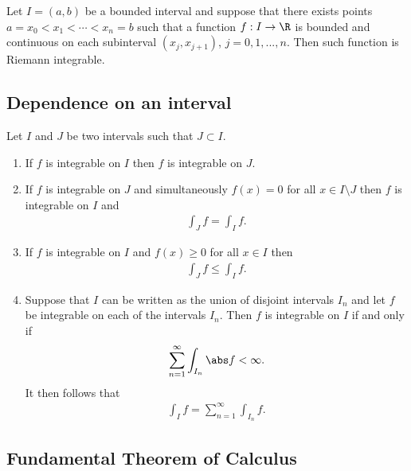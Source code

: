 \documentclass{article}
\begin{document}
\begin{corollary*}
    Let $I=(a,b)$ be a bounded interval and suppose that there exists points $a=x_0<x_1<\cdots<x_n=b$
    such that a function $f:I\to\R$ is bounded and continuous on each subinterval $(x_j,x_{j+1})$,
    $j=0,1,...,n$. Then such function is Riemann integrable.
\end{corollary*}

\subsection{Dependence on an interval}

\begin{theorem}[Notes 4.8]
    Let $I$ and $J$ be two intervals such that $J\subset I$.
    \begin{enumerate}
        \item If $f$ is integrable on $I$ then $f$ is integrable on $J$.
        \item If $f$ is integrable on $J$ and simultaneously $f(x)=0$ for all $x\in I\setminus J$
              then $f$ is integrable on $I$ and \begin{align*}
                  \int_J f = \int_I f.
              \end{align*}
        \item If $f$ is integrable on $I$ and $f(x)\geq 0$ for all $x\in I$ then \begin{align*}
                  \int_J f \leq \int_I f.
              \end{align*}
        \item Suppose that $I$ can be written as the union of disjoint intervals $I_n$ and let $f$
              be integrable on each of the intervals $I_n$. Then $f$ is integrable on $I$ if and only if
              \begin{align*}
                  \sum_{n=1}^\infty \int_{I_n} \abs f < \infty.
              \end{align*}
              It then follows that \begin{align*}
                  \int_I f = \sum_{n=1}^\infty \int_{I_n}f.
              \end{align*}
    \end{enumerate}
\end{theorem}

\subsection{Fundamental Theorem of Calculus}
\end{document}
